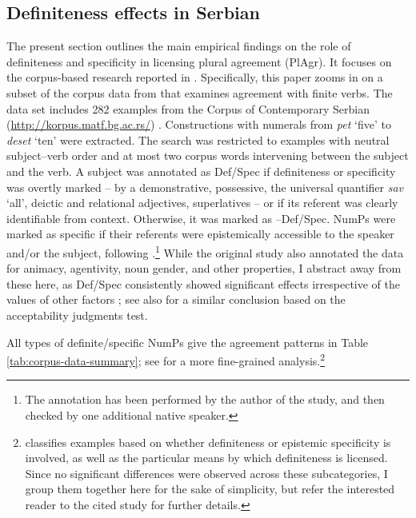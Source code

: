 \documentclass[output=paper,colorlinks,citecolor=brown
]{langscibook}
\begin{document}


\subsection{Definiteness effects in Serbian} \label{sect:definiteness-effects-in-serbian}
The present section outlines the main empirical findings on the role of definiteness and specificity in licensing plural agreement (PlAgr). It focuses on the corpus-based research reported in \citet{Milosavljevic2017, Milosavljevic2018MS}. Specifically, this paper zooms in on a subset of the corpus data from \citet{Milosavljevic2017} that examines agreement with finite verbs. The data set includes 282 examples from the Corpus of Contemporary Serbian (\href{http://korpus.matf.bg.ac.rs/}{http://korpus.matf.bg.ac.rs/}) \citep{VitasUtvic2013}. Constructions with numerals from \textit{pet} ‘five’ to \textit{deset} ‘ten’ were extracted. The search was restricted to examples with neutral subject–verb order and at most two corpus words intervening between the subject and the verb. A subject was annotated as Def/Spec if definiteness or specificity was overtly marked -- by a demonstrative, possessive, the universal quantifier \textit{sav} `all', deictic and relational adjectives, superlatives -- or if its referent was clearly identifiable from context. Otherwise, it was marked as –Def/Spec. NumPs were marked as specific if their referents were epistemically accessible to the speaker and/or the subject, following \citet{vonHeusinger2002}.\footnote{The annotation has been performed by the author of the study, and then checked by one additional native speaker.} While the original study also annotated the data for animacy, agentivity, noun gender, and other properties, I abstract away from these here, as Def/Spec consistently showed significant effects irrespective of the values of other factors \citep{Milosavljevic2017}; see also \citet{Milosavljevic2018nasledje} for a similar conclusion based on the acceptability judgments test.

    
All types of definite/specific NumPs give the agreement patterns in Table \ref{tab:corpus-data-summary}; see \citet{Milosavljevic2017} for a more fine-grained analysis.\footnote{\citet{Milosavljevic2017} classifies examples based on whether definiteness or epistemic specificity is involved, as well as the particular means by which definiteness is licensed. Since no significant differences were observed across these subcategories, I group them together here for the sake of simplicity, but refer the interested reader to the cited study for further details.}
\end{document}
